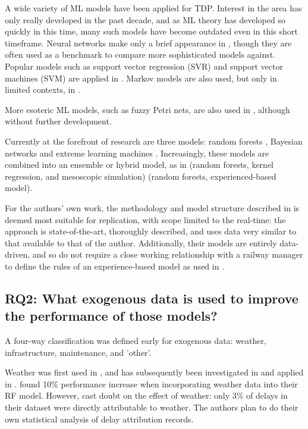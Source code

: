 \documentclass{article}
\begin{document}
A wide variety of ML models have been applied for TDP. Interest in the area has only really developed in the past decade, and as ML theory has developed so quickly in this time, many such models have become outdated even in this short timeframe. 
Neural networks make only a brief appearance in \cite{yaghini_et_al_2013}, though they are often used as a benchmark to compare more sophisticated models against.
Popular models such as support vector regression (SVR) and support vector machines (SVM) are applied in \cite{markovic_et_al_2015} \cite{barbour_et_al_2018}. Markov models are also used, but only in limited contexts, in \cite{gaurav_et_al_2018}.

More esoteric ML models, such as fuzzy Petri nets, are also used in \cite{milinkovic_et_al_2013}, although without further development.

Currently at the forefront of research are three models: random forests \cite{oneto_et_al_2016}\cite{nabian_et_al_2019}\cite{nair_et_al_2019}, Bayesian networks \cite{lessan_fu_wen_2019}\cite{corman_kecman_2018} and extreme learning machines \cite{oneto_et_al_2017a}\cite{oneto_et_al_2017b}. Increasingly, these models are combined into an ensemble or hybrid model, as in \cite{nair_et_al_2019} (random forests, kernel regression, and mesoscopic simulation) \cite{oneto_et_al_2019} (random forests, experienced-based model).

For the authors' own work, the methodology and model structure described in \cite{nair_et_al_2019} is deemed most suitable for replication, with scope limited to the real-time: the approach is state-of-the-art, thoroughly described, and uses data very similar to that available to that of the author. Additionally, their models are entirely data-driven, and so do not require a close working relationship with a railway manager to define the rules of an experience-based model as used in \cite{oneto_et_al_2019}.

\subsection{RQ2: What exogenous data is used to improve the performance of those models?}

A four-way classification was defined early for exogenous data: weather, infrastructure, maintenance, and 'other'. 

Weather was first used in \cite{oneto_et_al_2016}, and has subsequently been investigated in \cite{brazil_2017} and applied in \cite{wang_et_al_2019}\cite{nair_et_al_2019}\cite{nabian_et_al_2019}. \cite{oneto_et_al_2016} found 10\% performance increase when incorporating weather data into their RF model. However, \cite{nair_et_al_2019} cast doubt on the effect of weather: only 3\% of delays in their dataset were directly attributable to weather. The authors plan to do their own statistical analysis of delay attribution records. 
\end{document}
